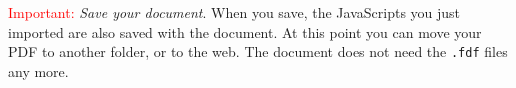 \documentclass{article}
\edef\amtIndent{\the\parindent}
\begin{document}
{\redpoint \textcolor{red}{Important:} \emph{Save your document}. When you
save, the JavaScripts you just imported are also saved with the
document. At this point you can move your \textsf{PDF} to another
folder, or to the web. The document does not need the
\texttt{.fdf} files any more.

\begin{comment}
\redpoint \textbf{For Distiller~4.0--4.05 Users.} Versions prior
to~5.0 of the Acrobat product cannot import document level
JavaScript contained in a \texttt{.fdf} file. The JavaScript needs
to be inserted ``by hand''.

The procedure is as follows: Modify the preamble and insert the \texttt{acrobativ}
option for the \textsf{exerquiz} package:
\begin{Verbatim}[xleftmargin=\amtIndent]
\documentclass{article}
\usepackage{amsmath}
\usepackage[dvips,tight,designi]{web}
\usepackage[acrobativ]{exerquiz}      %<- acrobativ option
\end{Verbatim}
\noindent This suppresses all the JavaScript code generation that is used in the case
of \textsf{pdftex}, \textsf{dvipdfm} or \textsf{Distiller~5.0$^+$}. After that
change, \LaTeX{} the document, and convert
the \texttt{.dvi} file to PostScript (using \texttt{dvips} or
\texttt{dvipsone}), and distill. Now, open the new \textsf{PDF} file
 in \textsf{Acrobat} (formerly known as
\textsf{Exchange}). Click on \texttt{Document > Insert Pages},
browse, and choose the \textsf{PDF} file \textsf{eq\_dljs.pdf},
which comes with the \cAcroB. The file is now inserted. Next, click
on \texttt{Document > Delete Pages} and delete the page you just
inserted! \textcolor{red}{Important:} Do a ``\texttt{Save As}''; now you are done!

The \textsf{PDF} file \textsf{eq\_dljs.pdf} contains all the
standard JavaScript that goes in at the document level.  In all
the other situations discussed above, you can modify the
JavaScript from the preamble, for example, in the \textsf{exerquiz}
source code we have
\begin{Verbatim}[xleftmargin=\amtIndent]
\newcommand\checkColor{["RGB", 0, .6, 0]}
\end{Verbatim}
This command is expanded when the document level JavaScript is imported into the
\textsf{PDF} file. If \cs{checkColor} has been redefined
\begin{Verbatim}[xleftmargin=\amtIndent]
\renewcommand\checkColor{["RGB", 1, 0, 0]}
\end{Verbatim}
it is this definition that is used in the expansion. This
convenience is lost for $\text{4.0} \le\text{\textsf{distiller}}\le\text{4.05}$.
You can edit \textsf{eq\_dljs.pdf} and make whatever changes you
please to the script, in terms of changing color.
\end{comment}

}
\end{document}

